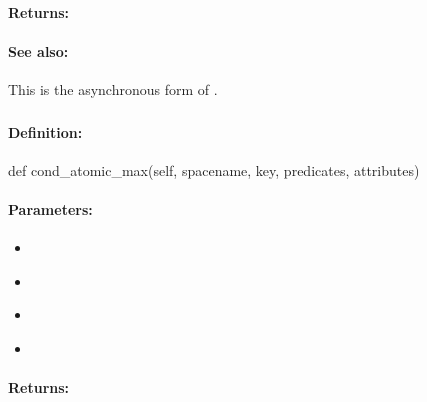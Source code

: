 \paragraph{Returns:}


\paragraph{See also:}  This is the asynchronous form of .

\pagebreak
\subsubsection{}
\label{api:python:cond_atomic_max}


\paragraph{Definition:}
\begin{pythoncode}
def cond_atomic_max(self, spacename, key, predicates, attributes)
\end{pythoncode}

\paragraph{Parameters:}
\begin{itemize}[noitemsep]
\item {}\\

\item {}\\

\item {}\\

\item {}\\

\end{itemize}

\paragraph{Returns:}


